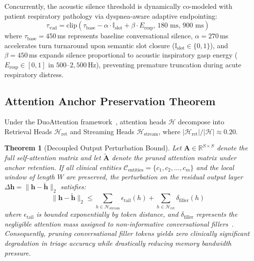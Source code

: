 \documentclass[10pt,journal,compsoc]{IEEEtran}
\newtheorem{theorem}{Theorem}
\begin{document}
Concurrently, the acoustic silence threshold is dynamically co-modeled with patient respiratory pathology via dyspnea-aware adaptive endpointing:
\begin{equation}
    \tau_{\text{vad}} = \text{clip}(\tau_{\text{base}} - \alpha \cdot \mathbb{I}_{\text{slot}} + \beta \cdot E_{\text{resp}}, \, 180\text{ ms}, \, 900\text{ ms})
\end{equation}
where $\tau_{\text{base}} = 450$\,ms represents baseline conversational silence, $\alpha = 270$\,ms accelerates turn turnaround upon semantic slot closure ($\mathbb{I}_{\text{slot}} \in \{0, 1\}$), and $\beta = 450$\,ms expands silence proportional to acoustic inspiratory gasp energy ($E_{\text{resp}} \in [0, 1]$ in
$500\text{--}2{,}500$\,Hz), preventing premature truncation during acute respiratory distress.

\subsection{Attention Anchor Preservation Theorem}
Under the DuoAttention framework~\cite{duoattention2025}, attention heads $\mathcal{H}$ decompose into Retrieval Heads $\mathcal{H}_{\text{ret}}$ and Streaming Heads $\mathcal{H}_{\text{stream}}$, where $|\mathcal{H}_{\text{ret}}| / |\mathcal{H}| \approx 0.20$.

\begin{theorem}[Decoupled Output Perturbation Bound]
Let $\mathbf{A} \in \mathbb{R}^{S \times S}$ denote the full self-attention matrix and let $\widetilde{\mathbf{A}}$ denote the pruned attention matrix under anchor retention. If all clinical entities $\mathcal{C}_{\text{entities}} = \{c_1, c_2, \dots, c_m\}$ and the local window of length $W$ are preserved, the perturbation on the
residual output layer $\Delta \mathbf{h} = \|\mathbf{h} - \widetilde{\mathbf{h}}\|_2$ satisfies:
\begin{equation}
    \|\mathbf{h} - \widetilde{\mathbf{h}}\|_2 \le \sum_{h \in \mathcal{H}_{\text{stream}}} \epsilon_{\text{tail}}(h) + \sum_{h \in \mathcal{H}_{\text{ret}}} \delta_{\text{filler}}(h)
\end{equation}
where $\epsilon_{\text{tail}}$ is bounded exponentially by token distance, and $\delta_{\text{filler}}$ represents the negligible attention mass assigned to non-informative conversational fillers~\cite{dropkv2026}. Consequently, pruning conversational filler tokens yields zero clinically significant degradation in triage accuracy while
drastically reducing memory bandwidth pressure.
\end{theorem}
\end{document}
